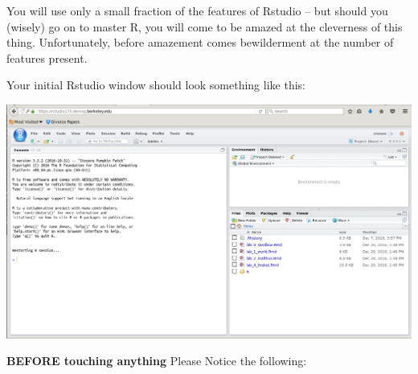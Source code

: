 \documentclass[11pt]{article}
\begin{document}
You will use only a small fraction of the features of Rstudio -- but should you (wisely) go on to master R, you will come to be amazed at the cleverness of this thing. Unfortunately,  before amazement comes bewilderment at the number of features present.

Your initial Rstudio window should look something like this:

\includegraphics[scale=.35]{RstudioStart}

\textbf{BEFORE touching anything} Please Notice the following:
\end{document}
